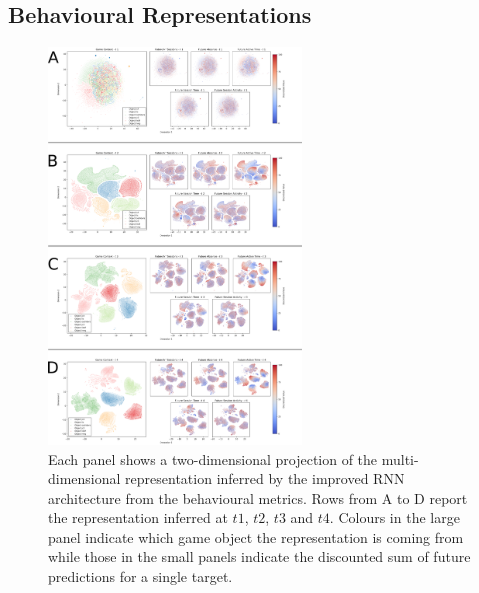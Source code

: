 \subsection{Behavioural Representations}
\begin{figure}[!htb]
\includegraphics[width=0.6\textwidth]{images/appendix_D/rnn_full_beha_umap.png}
\centering
\caption[\textbf{Lower dimensional representation of the latent representations generated by the improved RNN architecture from the behavioural metrics}]{Each panel shows a two-dimensional projection of the multi-dimensional representation inferred by the improved RNN architecture from the behavioural metrics. Rows from A to D report the representation inferred at $t1$, $t2$, $t3$ and $t4$. Colours in the large panel indicate which game object the representation is coming from while those in the small panels indicate the discounted sum of future predictions for a single target.}
\end{figure}
\FloatBarrier


